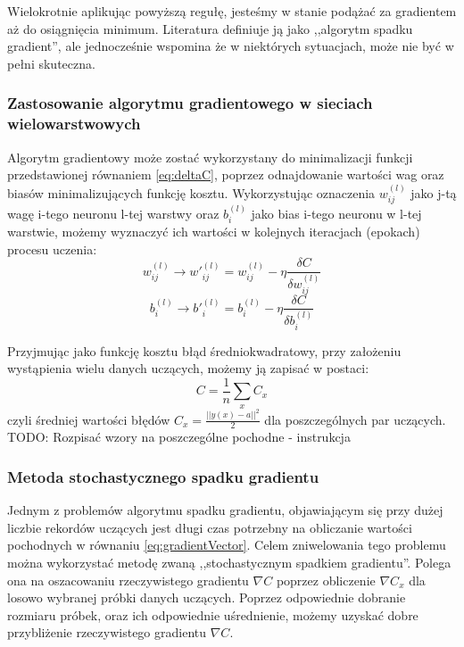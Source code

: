 \documentclass[12pt,twoside]{article}
\begin{document}
Wielokrotnie aplikując powyższą regułę, jesteśmy w stanie podążać za gradientem aż do osiągnięcia minimum.
Literatura \cite{nndl} definiuje ją jako ,,algorytm spadku gradient'', ale jednocześnie wspomina że w niektórych sytuacjach, może nie być w pełni skuteczna.

\subsubsection{Zastosowanie algorytmu gradientowego w sieciach wielowarstwowych}

Algorytm gradientowy może zostać wykorzystany do minimalizacji funkcji przedstawionej równaniem \ref{eq:deltaC}, poprzez odnajdowanie wartości wag oraz biasów minimalizujących funkcję kosztu.
Wykorzystując oznaczenia $w^{(l)}_{ij}$ jako j-tą wagę i-tego neuronu l-tej warstwy oraz $b^{(l)}_i$ jako bias i-tego neuronu w l-tej warstwie, możemy wyznaczyć ich wartości w kolejnych iteracjach (epokach) procesu uczenia:
\begin{equation}
	\label{weightUpdate}
	w^{(l)}_{ij} \rightarrow {w'}^{(l)}_{ij} = w^{(l)}_{ij} - \eta \frac{\delta C}{\delta w^{(l)}_{ij}}
\end{equation}
\begin{equation}
	\label{biasUpdate}
	b^{(l)}_{i} \rightarrow {b'}^{(l)}_{i} = b^{(l)}_{i} - \eta \frac{\delta C}{\delta b^{(l)}_{i}}
\end{equation}

Przyjmując jako funkcję kosztu błąd średniokwadratowy, przy założeniu wystąpienia wielu danych uczących, możemy ją zapisać w postaci:
\begin{equation}
	C = \frac{1}{n} \sum \limits_x C_x
\end{equation}
czyli średniej wartości błędów $C_{x} = \frac{||y(x) - a||^2}{2}$ dla poszczególnych par uczących.
TODO: Rozpisać wzory na poszczególne pochodne - instrukcja \cite{kiaMultiLayer}



\subsubsection{Metoda stochastycznego spadku gradientu}
Jednym z problemów algorytmu spadku gradientu, objawiającym się przy dużej liczbie rekordów uczących \cite{nndl} jest długi czas potrzebny na obliczanie wartości pochodnych w równaniu \ref{eq:gradientVector}.
Celem zniwelowania tego problemu można wykorzystać metodę zwaną ,,stochastycznym spadkiem gradientu''.
Polega ona na oszacowaniu rzeczywistego gradientu $\nabla C$ poprzez obliczenie $\nabla C_x$ dla losowo wybranej próbki danych uczących.
Poprzez odpowiednie dobranie rozmiaru próbek, oraz ich odpowiednie uśrednienie, możemy uzyskać dobre przybliżenie rzeczywistego gradientu $\nabla C$.\cite{nndl}
\end{document}

